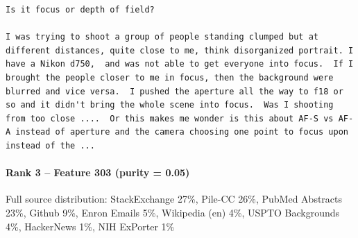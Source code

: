 \begin{verbatim}
Is it focus or depth of field?

I was trying to shoot a group of people standing clumped but at different distances, quite close to me, think disorganized portrait. I have a Nikon d750,  and was not able to get everyone into focus.  If I brought the people closer to me in focus, then the background were blurred and vice versa.  I pushed the aperture all the way to f18 or so and it didn't bring the whole scene into focus.  Was I shooting from too close ....  Or this makes me wonder is this about AF-S vs AF-A instead of aperture and the camera choosing one point to focus upon instead of the ...

\end{verbatim}

\paragraph*{Rank 3 -- Feature 303 (purity = 0.05)}

Full source distribution: StackExchange 27\%, Pile-CC 26\%, PubMed Abstracts 23\%, Github 9\%, Enron Emails 5\%, Wikipedia (en) 4\%, USPTO Backgrounds 4\%, HackerNews 1\%, NIH ExPorter 1\%

